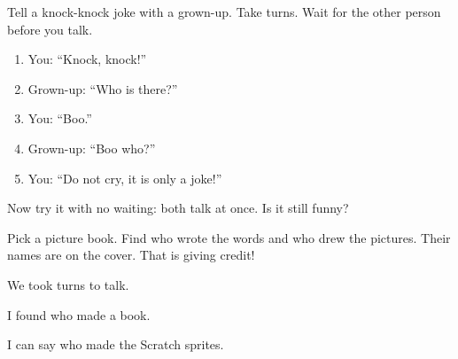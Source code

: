 
\begin{playathome}
Tell a knock-knock joke with a grown-up. Take turns. Wait for the other person before you talk.
\begin{enumerate}[leftmargin=1.4em,itemsep=2pt]
  \item You: \enquote{Knock, knock!}
  \item Grown-up: \enquote{Who is there?}
  \item You: \enquote{Boo.}
  \item Grown-up: \enquote{Boo who?}
  \item You: \enquote{Do not cry, it is only a joke!}
\end{enumerate}
Now try it with no waiting: both talk at once. Is it still funny?
\end{playathome}

\begin{playathome}
Pick a picture book. Find who wrote the words and who drew the pictures. Their names are on the cover. That is giving credit!
\end{playathome}

\begin{selfcheck}
  \item We took turns to talk.
  \item I found who made a book.
  \item I can say who made the Scratch sprites.
\end{selfcheck}
